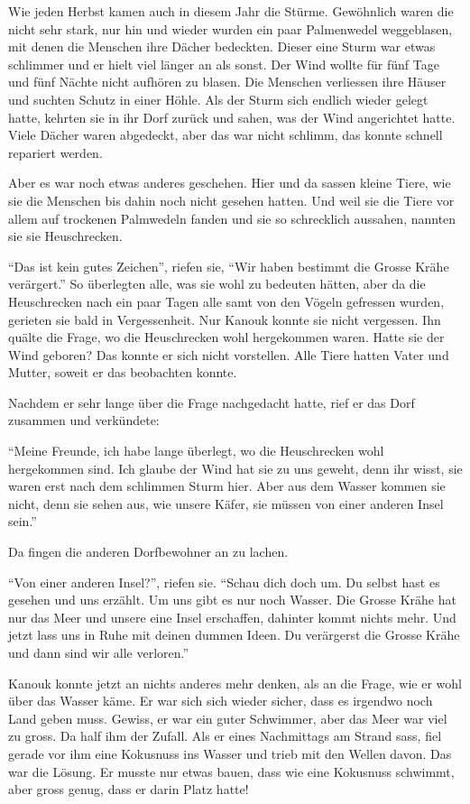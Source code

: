 Wie jeden Herbst kamen auch in diesem Jahr die Stürme. Gewöhnlich waren die nicht sehr stark, nur hin und wieder wurden ein paar Palmenwedel weggeblasen, mit denen die Menschen ihre Dächer bedeckten. Dieser eine Sturm war etwas schlimmer und er hielt viel länger an als sonst. Der Wind wollte für fünf Tage und fünf Nächte nicht aufhören zu blasen. Die Menschen verliessen ihre Häuser und suchten Schutz in einer Höhle. Als der Sturm sich endlich wieder gelegt hatte, kehrten sie in ihr Dorf zurück und sahen, was der Wind angerichtet hatte. Viele Dächer waren abgedeckt, aber das war nicht schlimm, das konnte schnell repariert werden. 

Aber es war noch etwas anderes geschehen. Hier und da sassen kleine Tiere, wie sie die Menschen bis dahin noch nicht gesehen hatten. Und weil sie die Tiere vor allem auf trockenen Palmwedeln fanden und sie so schrecklich aussahen, nannten sie sie Heuschrecken. 

\enquote{Das ist kein gutes Zeichen}, riefen sie, \enquote{Wir haben bestimmt die Grosse Krähe verärgert.} So überlegten alle, was sie wohl zu bedeuten hätten, aber da die Heuschrecken nach ein paar Tagen alle samt von den Vögeln gefressen wurden, gerieten sie bald in Vergessenheit. Nur Kanouk konnte sie nicht vergessen. Ihn quälte die Frage, wo die Heuschrecken wohl hergekommen waren. Hatte sie der Wind geboren? Das konnte er sich nicht vorstellen. Alle Tiere hatten Vater und Mutter, soweit er das beobachten konnte. 

Nachdem er sehr lange über die Frage nachgedacht hatte, rief er das Dorf zusammen und verkündete:

\enquote{Meine Freunde, ich habe lange überlegt, wo die Heuschrecken wohl hergekommen sind. Ich glaube der Wind hat sie zu uns geweht, denn ihr wisst, sie waren erst nach dem schlimmen Sturm hier. Aber aus dem Wasser kommen sie nicht, denn sie sehen aus, wie unsere Käfer, sie müssen von einer anderen Insel sein.}

Da fingen die anderen Dorfbewohner an zu lachen.

\enquote{Von einer anderen Insel?}, riefen sie. \enquote{Schau dich doch um. Du selbst hast es gesehen und uns erzählt. Um uns gibt es nur noch Wasser. Die Grosse Krähe hat nur das Meer und unsere eine Insel erschaffen, dahinter kommt nichts mehr. Und jetzt lass uns in Ruhe mit deinen dummen Ideen. Du verärgerst die Grosse Krähe und dann sind wir alle verloren.}

Kanouk konnte jetzt an nichts anderes mehr denken, als an die Frage, wie er wohl über das Wasser käme. Er war sich sich wieder sicher, dass es irgendwo noch Land geben muss. Gewiss, er war ein guter Schwimmer, aber das Meer war viel zu gross. Da half ihm der Zufall. Als er eines Nachmittags am Strand sass, fiel gerade vor ihm eine Kokusnuss ins Wasser und trieb mit den Wellen davon. Das war die Lösung. Er musste nur etwas bauen, dass wie eine Kokusnuss schwimmt, aber gross genug, dass er darin Platz hatte!


